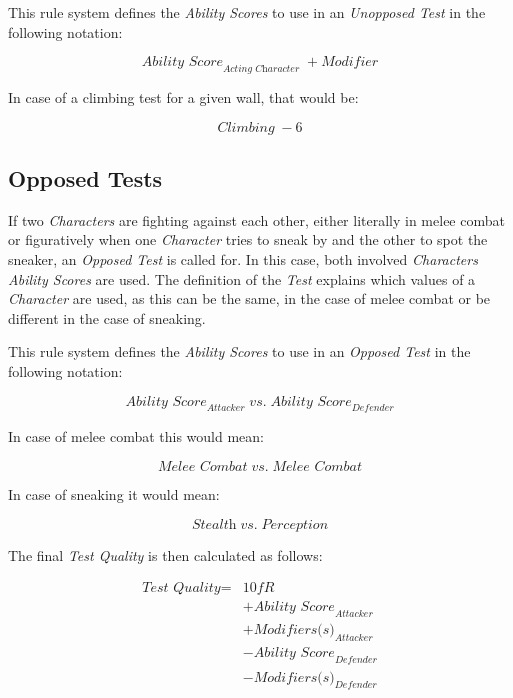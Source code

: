 This rule system defines the \emph{Ability Scores} to use in an
\emph{Unopposed Test} in the following notation:

\begin{equation}
    \textit{Ability Score}_\textit{Acting Character} \; + \textit{Modifier}
\end{equation}

In case of a climbing test for a given wall, that would be:

\begin{equation*}
    \textit{Climbing} \; -6
\end{equation*}

\subsection{Opposed Tests}

If two \emph{Characters} are fighting against each other, either literally in melee
combat or figuratively when one \emph{Character} tries to sneak by and the other to
spot the sneaker, an \emph{Opposed Test} is called for. In this case, both involved
\emph{Characters} \emph{Ability Scores} are used. The definition of the \emph{Test}
explains which values of a \emph{Character} are used, as this can be the same, in the
case of melee combat or be different in the case of sneaking.

This rule system defines the \emph{Ability Scores} to use in an
\emph{Opposed Test} in the following notation:

\begin{equation}
    \textit{Ability Score}_\textit{Attacker} \; \textit{vs.} \; \textit{Ability Score}_\textit{Defender}
\end{equation}

In case of melee combat this would mean:

\begin{equation*}
    \textit{Melee Combat} \; \textit{vs.} \; \textit{Melee Combat}
\end{equation*}

In case of sneaking it would mean:

\begin{equation*}
    \textit{Stealth} \; \textit{vs.} \; \textit{Perception}
\end{equation*}

The final \emph{Test Quality} is then calculated as follows:

\begin{equation}
    \begin{split}
        \textit{Test Quality} = {} & \textit{10fR} \\
        & + \textit{Ability Score}_\textit{Attacker} \\
        & + \textit{Modifiers(s)}_\textit{Attacker} \\
        & - \textit{Ability Score}_\textit{Defender} \\
        & - \textit{Modifiers(s)}_\textit{Defender} \\
    \end{split}
\end{equation}


